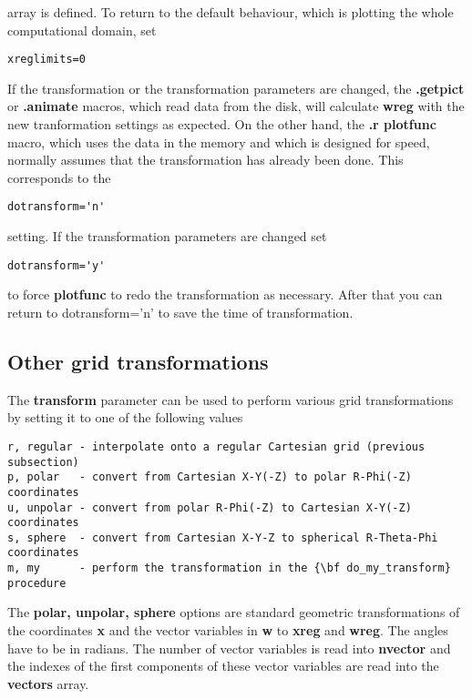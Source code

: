    array is defined. 
   To return to the default behaviour, which is plotting the whole 
   computational domain, set
\begin{verbatim}
xreglimits=0
\end{verbatim}
   If the transformation or the transformation parameters are changed,
   the {\bf .getpict} or {\bf .animate} macros, which read data from
   the disk, will calculate {\bf wreg} with the new tranformation settings
   as expected. On the other hand, the {\bf .r plotfunc} macro, 
   which uses the data in the memory
   and which is designed for speed, normally assumes that the transformation 
   has already been done. This corresponds to the
\begin{verbatim}
dotransform='n'
\end{verbatim}
   setting. If the transformation parameters are changed set
\begin{verbatim}
dotransform='y'
\end{verbatim}
   to force {\bf plotfunc} to redo the transformation as necessary.
   After that you can return to dotransform='n' to save the time of
   transformation.

\subsection{Other grid transformations \label{s-gridtransform}}

   The {\bf transform} parameter can be used to perform various
   grid transformations by setting it to one of the following values
\begin{verbatim}
r, regular - interpolate onto a regular Cartesian grid (previous subsection)
p, polar   - convert from Cartesian X-Y(-Z) to polar R-Phi(-Z) coordinates
u, unpolar - convert from polar R-Phi(-Z) to Cartesian X-Y(-Z) coordinates
s, sphere  - convert from Cartesian X-Y-Z to spherical R-Theta-Phi coordinates
m, my      - perform the transformation in the {\bf do_my_transform} procedure
\end{verbatim}
The {\bf polar, unpolar, sphere} options are standard geometric
transformations of the coordinates {\bf x} and the vector variables in
{\bf w} to {\bf xreg} and {\bf wreg}. The angles have to be in
radians.  The number of vector variables is read into {\bf nvector}
and the indexes of the first components of these vector variables are
read into the {\bf vectors} array.

